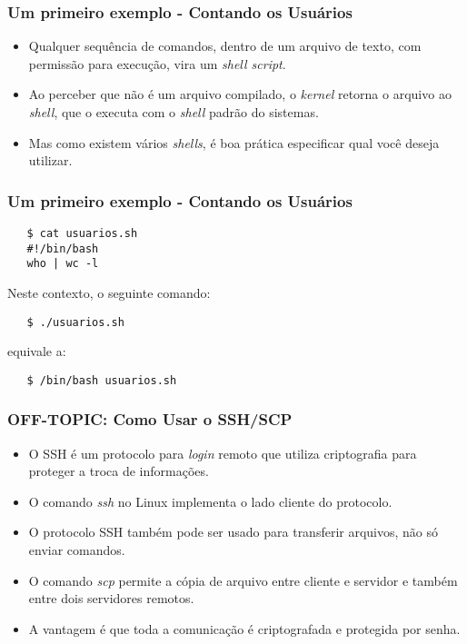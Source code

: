\documentclass{beamer}
\begin{document}
\begin{frame}[fragile]
   \frametitle{Um primeiro exemplo - Contando os Usuários}
   \begin{itemize}
      \item Qualquer sequência de comandos, dentro de um arquivo de texto, com permissão para execução, vira um \textit{shell script}.
      \item Ao perceber que não é um arquivo compilado, o \textit{kernel} retorna o arquivo ao \textit{shell}, que o executa com o \textit{shell} padrão do sistemas.
      \item Mas como existem vários \textit{shells}, é boa prática especificar qual você deseja utilizar. 
   \end{itemize}
\end{frame}

\begin{frame}[fragile]
   \frametitle{Um primeiro exemplo - Contando os Usuários}
   \begin{verbatim}
   $ cat usuarios.sh 
   #!/bin/bash
   who | wc -l 
   \end{verbatim}
   Neste contexto, o seguinte comando: 
   \begin{verbatim}
   $ ./usuarios.sh
   \end{verbatim}
   equivale a:
   \begin{verbatim}
   $ /bin/bash usuarios.sh
   \end{verbatim}
\end{frame}

\begin{frame}
   \frametitle{OFF-TOPIC: Como Usar o SSH/SCP}
   \begin{itemize}
      \item O SSH é um protocolo para \textit{login} remoto que utiliza criptografia para proteger a troca de informações.
      \item O comando \textit{ssh} no Linux implementa o lado cliente do protocolo.	
      \item O protocolo SSH também pode ser usado para transferir arquivos, não só enviar comandos.
      \item O comando \textit{scp} permite a cópia de arquivo entre cliente e servidor e também entre dois servidores remotos.
      \item A vantagem é que toda a comunicação é criptografada e protegida por senha.
   \end{itemize}
\end{frame}
\end{document}
